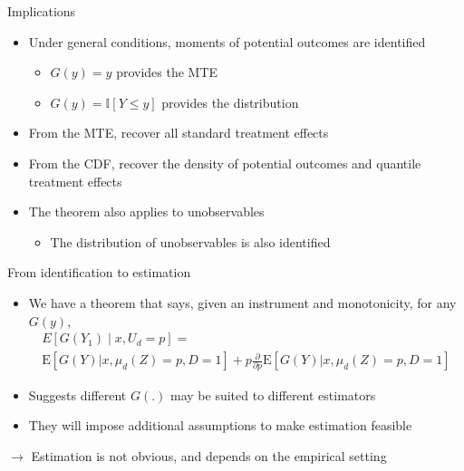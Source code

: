 \documentclass{beamer}
\newcommand{\E}{\mathrm{E}} %
\begin{document}
\begin{frame}{Implications}

\begin{itemize}

\item Under general conditions, moments of potential outcomes are
  identified
\begin{itemize}
\item $G(y) = y$ provides the MTE

\item $G(y) = \mathbb{I} \left[ Y \leq y \right]$ provides the
  distribution
\end{itemize}

\pause

\item From the MTE, recover all standard treatment effects

\item From the CDF, recover the density of potential outcomes and
  quantile treatment effects

\pause

\item The theorem also applies to unobservables
\begin{itemize}
\item The distribution of unobservables is also identified
\end{itemize}

\end{itemize}

\end{frame}


\begin{frame}{From identification to estimation}
  \begin{itemize}
  \item We have a theorem that says, given an instrument and monotonicity, for any $G(y)$,
    \begin{multline*}
      E[G(Y_1)\mid x, U_d=p] = \\ \E \left[ G(Y) | x, \mu_d(Z) = p, D = 1 \right] + p \frac{\partial}{\partial p} \E\left[ G(Y) |  x, \mu_d(Z) = p, D = 1 \right]
    \end{multline*}
  \item Suggests different $G(.)$ may be suited to different estimators
    \item They will impose additional assumptions to make estimation feasible
  \end{itemize}
    $\rightarrow$ Estimation is not obvious, and depends on the empirical setting


\end{frame}
\end{document}
